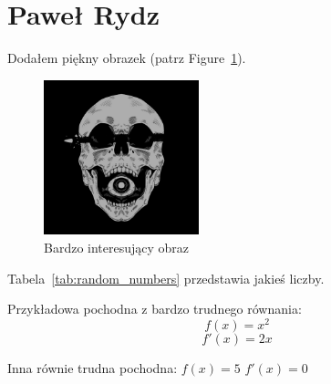 \section{Paweł Rydz}
\label{sec:rydzpawel}

Dodałem piękny obrazek (patrz Figure~\ref{fig:skull}).

\begin{figure}[htbp]
    \centering
    \includegraphics[width=0.4\textwidth]{pictures/skull.jpg}
    \caption{Bardzo interesujący obraz}
    \label{fig:skull}
\end{figure}

Tabela~\ref{tab:random_numbers} przedstawia jakieś liczby.



Przykładowa pochodna z bardzo trudnego równania: \[f(x) = x^2\]
\[f'(x) = 2x\]


Inna równie trudna pochodna:
$ f(x) = 5 $ $ f'(x) = 0 $